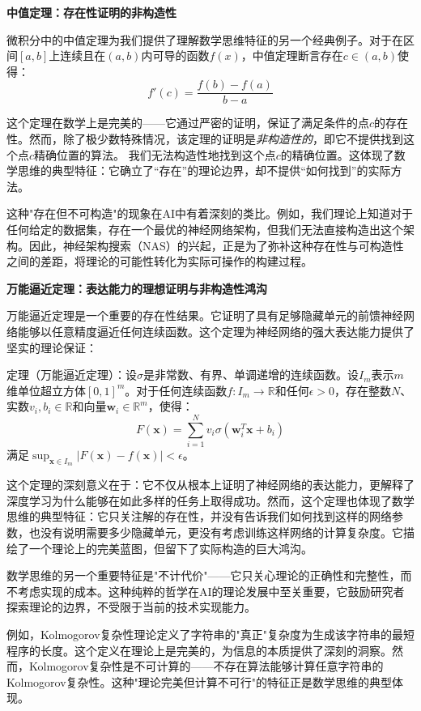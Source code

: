 \textbf{中值定理：存在性证明的非构造性}

微积分中的中值定理为我们提供了理解数学思维特征的另一个经典例子。对于在区间$[a,b]$上连续且在$(a,b)$内可导的函数$f(x)$，中值定理断言存在$c \in (a,b)$使得：
$$f'(c) = \frac{f(b) - f(a)}{b - a}$$

这个定理在数学上是完美的——它通过严密的证明，保证了满足条件的点$c$的存在性。然而，除了极少数特殊情况，该定理的证明是\textit{非构造性的}，即它不提供找到这个点$c$精确位置的算法。 我们无法构造性地找到这个点$c$的精确位置。这体现了数学思维的典型特征：它确立了“存在”的理论边界，却不提供“如何找到”的实际方法。

这种"存在但不可构造"的现象在AI中有着深刻的类比。例如，我们理论上知道对于任何给定的数据集，存在一个最优的神经网络架构，但我们无法直接构造出这个架构。因此，神经架构搜索（NAS）的兴起，正是为了弥补这种存在性与可构造性之间的差距，将理论的可能性转化为实际可操作的构建过程。

\textbf{万能逼近定理：表达能力的理想证明与非构造性鸿沟}

万能逼近定理是一个重要的存在性结果。它证明了具有足够隐藏单元的前馈神经网络能够以任意精度逼近任何连续函数。这个定理为神经网络的强大表达能力提供了坚实的理论保证：

定理（万能逼近定理）：设$\sigma$是非常数、有界、单调递增的连续函数。设$I_m$表示$m$维单位超立方体$[0,1]^m$。对于任何连续函数$f: I_m \to \mathbb{R}$和任何$\epsilon > 0$，存在整数$N$、实数$v_i, b_i \in \mathbb{R}$和向量$\mathbf{w}_i \in \mathbb{R}^m$，使得：
$$F(\mathbf{x}) = \sum_{i=1}^{N} v_i \sigma(\mathbf{w}_i^T \mathbf{x} + b_i)$$
满足$\sup_{\mathbf{x} \in I_m} |F(\mathbf{x}) - f(\mathbf{x})| < \epsilon$。

这个定理的深刻意义在于：它不仅从根本上证明了神经网络的表达能力，更解释了深度学习为什么能够在如此多样的任务上取得成功。然而，这个定理也体现了数学思维的典型特征：它只关注解的存在性，并没有告诉我们如何找到这样的网络参数，也没有说明需要多少隐藏单元，更没有考虑训练这样网络的计算复杂度。它描绘了一个理论上的完美蓝图，但留下了实际构造的巨大鸿沟。


数学思维的另一个重要特征是"不计代价"——它只关心理论的正确性和完整性，而不考虑实现的成本。这种纯粹的哲学在AI的理论发展中至关重要，它鼓励研究者探索理论的边界，不受限于当前的技术实现能力。

例如，Kolmogorov复杂性理论定义了字符串的"真正"复杂度为生成该字符串的最短程序的长度。这个定义在理论上是完美的，为信息的本质提供了深刻的洞察。然而，Kolmogorov复杂性是不可计算的——不存在算法能够计算任意字符串的Kolmogorov复杂性。这种"理论完美但计算不可行"的特征正是数学思维的典型体现。

